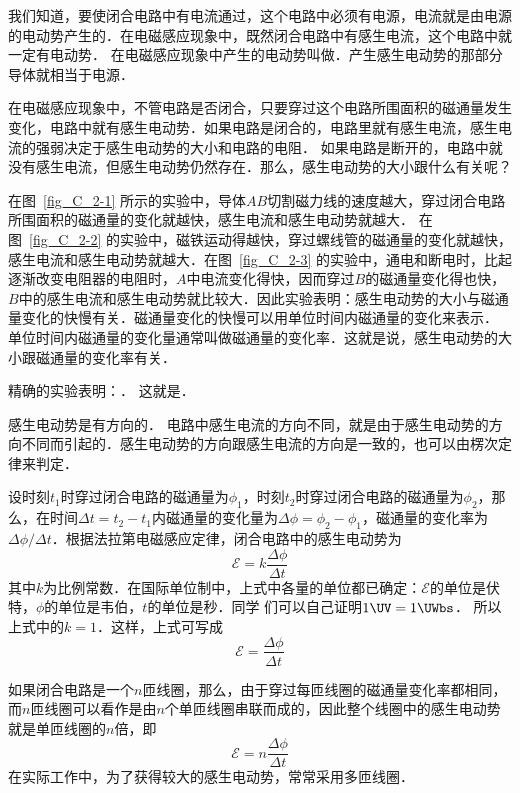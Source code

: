 我们知道，要使闭合电路中有电流通过，这个电路中必须有电源，电流就是由电源的电动势产生的．在电磁感应现象中，既然闭合电路中有感生电流，这个电路中就一定有电动势．
在电磁感应现象中产生的电动势叫做．产生感生电动势的那部分导体就相当于电源．

在电磁感应现象中，不管电路是否闭合，只要穿过这个电路所围面积的磁通量发生变化，电路中就有感生电动势．如果电路是闭合的，电路里就有感生电流，感生电流的强弱决定于感生电动势的大小和电路的电阻．
如果电路是断开的，电路中就没有感生电流，但感生电动势仍然存在．那么，感生电动势的大小跟什么有关呢？

在图~\ref{fig_C_2-1} 所示的实验中，导体$AB$切割磁力线的速度越大，穿过闭合电路所围面积的磁通量的变化就越快，感生电流和感生电动势就越大．
在图~\ref{fig_C_2-2} 的实验中，磁铁运动得越快，穿过螺线管的磁通量的变化就越快，感生电流和感生电动势就越大．在图~\ref{fig_C_2-3} 的实验中，通电和断电时，比起逐渐改变电阻器的电阻时，$A$中电流变化得快，因而穿过$B$的磁通量变化得也快，$B$中的感生电流和感生电动势就比较大．因此实验表明：感生电动势的大小与磁通量变化的快慢有关．磁通量变化的快慢可以用单位时间内磁通量的变化来表示．
单位时间内磁通量的变化量通常叫做磁通量的变化率．这就是说，感生电动势的大小跟磁通量的变化率有关．

精确的实验表明：．
这就是．

感生电动势是有方向的．
电路中感生电流的方向不同，就是由于感生电动势的方向不同而引起的．感生电动势的方向跟感生电流的方向是一致的，也可以由楞次定律来判定．

设时刻$t_1$时穿过闭合电路的磁通量为$\phi_1$，时刻$t_2$时穿过闭合电路的磁通量为$\phi_2$，那么，在时间$\Delta t=t_2-t_1$内磁通量的变化量为$\Delta \phi=\phi_2-\phi_1$，磁通量的变化率为$\Delta \phi/\Delta t$．根据法拉第电磁感应定律，闭合电路中的感生电动势为
\[\mathcal{E}=k\frac{\Delta \phi}{\Delta t}\]
其中$k$为比例常数．在国际单位制中，上式中各量的单位都已确定：$\mathcal{E}$的单位是伏特，$\phi$的单位是韦伯，$t$的单位是秒．同学
们可以自己证明$1 \UV=1 \UWbs  $．
所以上式中的$k=1$．这样，上式可写成
\begin{equation}\label{eq_C_2-1}
    \mathcal{E}=\frac{\Delta \phi}{\Delta t}
\end{equation}

如果闭合电路是一个$n$匝线圈，那么，由于穿过每匝线圈的磁通量变化率都相同，而$n$匝线圈可以看作是由$n$个单匝线圈串联而成的，因此整个线圈中的感生电动势就是单匝线圈的$n$倍，即
\begin{equation}\label{eq_C_2-2}
    \mathcal{E}=n\frac{\Delta \phi}{\Delta t}
\end{equation}
在实际工作中，为了获得较大的感生电动势，常常采用多匝线圈．

